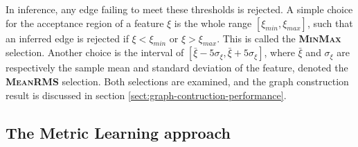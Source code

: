 In inference, any edge failing to meet these thresholds is rejected. 
A simple choice for the acceptance region of a feature $\xi$ is the whole range $[\xi_{min}, \xi_{max}]$, such that an inferred edge is rejected if $\xi < \xi_{min}$ or $\xi>\xi_{max}$. 
This is called the \textbf{\textsc{MinMax}} selection. 
Another choice is the interval of $[\bar{\xi} - 5\sigma_{\xi}, \bar{\xi}+5\sigma_{\xi}]$, where $\bar{\xi}$ and $\sigma_{\xi}$ are respectively the sample mean and standard deviation of the feature, denoted the \textbf{\textsc{MeanRMS}} selection. 
Both selections are examined, and the graph construction result is discussed in section \ref{sect:graph-contruction-performance}.

\subsection{The Metric Learning approach}
\label{subsect:metric-learning}

